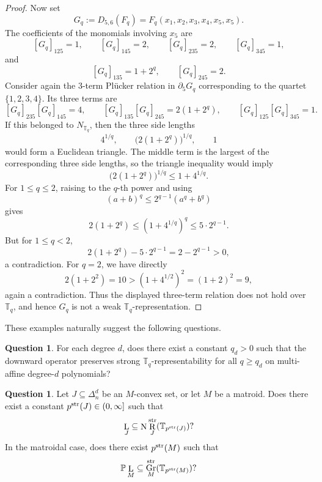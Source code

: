 \documentclass[12pt]{amsart}
\theoremstyle{definition}
\newtheorem{question}[theorem]{Question}
\newcommand{\1}{\mathbf{1}}
\DeclareMathOperator{\upN}{N}   %
\DeclareMathOperator{\upL}{L}   %
\DeclareMathOperator{\upR}{R}   %
\DeclareMathOperator{\Gr}{Gr}
\renewcommand\P{{\mathbb P}}
\newcommand\T{{\mathbb T}}
\begin{document}
\begin{proof}
Now set
\[
G_q:=D_{5,6}(F_q)=F_q(x_1,x_2,x_3,x_4,x_5,x_5).
\]
The coefficients of the monomials involving $x_5$ are
\[
[G_q]_{125}=1,\qquad [G_q]_{145}=2,\qquad [G_q]_{235}=2,\qquad [G_q]_{345}=1,
\]
and
\[
[G_q]_{135}=1+2^q,\qquad [G_q]_{245}=2.
\]
Consider again the $3$-term Pl\"ucker relation in $\partial_5 G_q$ corresponding to the
quartet $\{1,2,3,4\}$. Its three terms are
\[
[G_q]_{235}[G_q]_{145}=4,
\qquad
[G_q]_{135}[G_q]_{245}=2(1+2^q),
\qquad
[G_q]_{125}[G_q]_{345}=1.
\]
If this belonged to $N_{\T_q}$, then the three side lengths
\[
4^{1/q},\qquad \bigl(2(1+2^q)\bigr)^{1/q},\qquad 1
\]
would form a Euclidean triangle. 
The middle term is the largest of the corresponding three side lengths, so the triangle
inequality would imply
\[
\bigl(2(1+2^q)\bigr)^{1/q}\le 1+4^{1/q}.
\]
For $1\le q\le 2$, raising to the $q$-th power and using
\[
(a+b)^q\le 2^{q-1}(a^q+b^q)
\]
gives
\[
2(1+2^q)\le (1+4^{1/q})^q\le 5\cdot 2^{q-1}.
\]
But for $1\le q<2$,
\[
2(1+2^q)-5\cdot 2^{q-1}=2-2^{q-1}>0,
\]
a contradiction. For $q=2$, we have directly
\[
2(1+2^2)=10>(1+4^{1/2})^2=(1+2)^2=9,
\]
again a contradiction. 
Thus the displayed three-term relation does not hold
over $\T_q$, and hence $G_q$ is not a weak $\T_q$-representation.
\end{proof}

These examples naturally suggest the following questions.

\begin{question}
\label{question:downward-threshold}
For each degree $d$, does there exist a constant $q_d>0$ such that the downward
operator preserves strong $\T_q$-representability for all $q\ge q_d$ on multi-affine
degree-$d$ polynomials?
\end{question}

\begin{question}
\label{question:strong-upper}
Let $J\subseteq \Delta_n^d$ be an $M$-convex set, or let $M$ be a matroid.
Does there exist a constant $p^{\rm str}(J)\in (0,\infty]$ such that
\[
\upL_J \subseteq \upN \upR_J^{\rm str}(\T_{p^{\rm str}(J)})?
\]
In the matroidal case, does there exist $p^{\rm str}(M)$ such that
\[
\P\upL_M \subseteq \Gr_M^{\rm str}(\T_{p^{\rm str}(M)})?
\]
\end{question}
\end{document}
